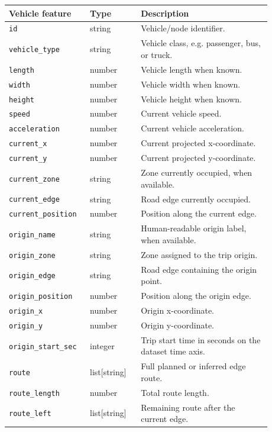 \begin{table}[!htbp]
\centering
\scriptsize
\begin{tabular}{p{0.24\linewidth}p{0.18\linewidth}p{0.46\linewidth}}
\toprule
\textbf{Vehicle feature} & \textbf{Type} & \textbf{Description} \\
\midrule
\texttt{id} & string & Vehicle/node identifier. \\
\texttt{vehicle\_type} & string & Vehicle class, e.g. passenger, bus, or truck. \\
\texttt{length} & number & Vehicle length when known. \\
\texttt{width} & number & Vehicle width when known. \\
\texttt{height} & number & Vehicle height when known. \\
\texttt{speed} & number & Current vehicle speed. \\
\texttt{acceleration} & number & Current vehicle acceleration. \\
\texttt{current\_x} & number & Current projected x-coordinate. \\
\texttt{current\_y} & number & Current projected y-coordinate. \\
\texttt{current\_zone} & string & Zone currently occupied, when available. \\
\texttt{current\_edge} & string & Road edge currently occupied. \\
\texttt{current\_position} & number & Position along the current edge. \\
\texttt{origin\_name} & string & Human-readable origin label, when available. \\
\texttt{origin\_zone} & string & Zone assigned to the trip origin. \\
\texttt{origin\_edge} & string & Road edge containing the origin point. \\
\texttt{origin\_position} & number & Position along the origin edge. \\
\texttt{origin\_x} & number & Origin x-coordinate. \\
\texttt{origin\_y} & number & Origin y-coordinate. \\
\texttt{origin\_start\_sec} & integer & Trip start time in seconds on the dataset time axis. \\
\texttt{route} & list[string] & Full planned or inferred edge route. \\
\texttt{route\_length} & number & Total route length. \\
\texttt{route\_left} & list[string] & Remaining route after the current edge. \\

\end{tabular}
\end{table}
